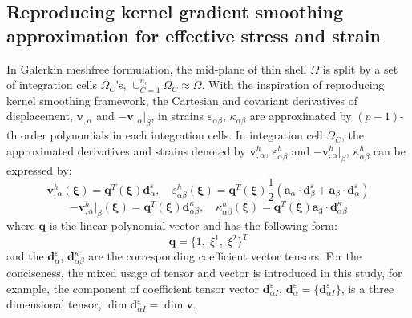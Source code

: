 \subsection{Reproducing kernel gradient smoothing approximation for effective stress and strain}
In Galerkin meshfree formulation, the mid-plane of thin shell $\Omega$ is split by a set of integration cells $\Omega_C$'s, $\cup_{C=1}^{n_e}\Omega_C\approx \Omega$. With the inspiration of reproducing kernel smoothing framework, the Cartesian and covariant derivatives of displacement, $\boldsymbol v_{,\alpha}$ and $-\boldsymbol v_{,\alpha}\vert_\beta$, in strains $\varepsilon_{\alpha\beta}$, $\kappa_{\alpha\beta}$ are approximated by $(p-1)$-th order polynomials in each integration cells. In integration cell $\Omega_C$, the approximated derivatives and strains denoted by $\boldsymbol v^h_{,\alpha}$, $\varepsilon^h_{\alpha\beta}$ and $-\boldsymbol v^h_{,\alpha}\vert_\beta$, $\kappa^h_{\alpha\beta}$ can be expressed by:
\begin{equation}\label{approxsn1}
    \boldsymbol v^h_{,\alpha}(\boldsymbol \xi) = \boldsymbol q^T(\boldsymbol \xi) \boldsymbol d_{\alpha}^\varepsilon, \quad
    \varepsilon^h_{\alpha\beta}(\boldsymbol \xi) = \boldsymbol q^T(\boldsymbol \xi) \frac{1}{2}(\boldsymbol a_\alpha \cdot \boldsymbol d_{\beta}^\varepsilon + \boldsymbol a_\beta \cdot \boldsymbol d_{\alpha}^\varepsilon)
\end{equation}
\begin{equation}\label{approxsn2}
    -\boldsymbol v^h_{,\alpha}\vert_\beta(\boldsymbol \xi) = \boldsymbol q^T(\boldsymbol \xi) \boldsymbol d_{\alpha\beta}^\kappa , \quad
    \kappa^h_{\alpha\beta}(\boldsymbol \xi) = \boldsymbol q^T(\boldsymbol \xi) \boldsymbol a_3 \cdot \boldsymbol d_{\alpha\beta}^\kappa
\end{equation}
where $\boldsymbol q$ is the linear polynomial vector and has the following form:
\begin{equation}
\boldsymbol q = \{ 1,\; \xi^1,\; \xi^2\}^T
\end{equation}
and the $\boldsymbol d^\varepsilon_{\alpha}$, $\boldsymbol d^\kappa_{\alpha\beta}$ are the corresponding coefficient vector tensors. For the conciseness, the mixed usage of tensor and vector is introduced in this study, for example, the component of coefficient tensor vector $\boldsymbol d^\varepsilon_{\alpha I}$, $\boldsymbol d^\varepsilon_\alpha = \{\boldsymbol d^\varepsilon_{\alpha I}\}$, is a three dimensional tensor, $\dim \boldsymbol d^\varepsilon_{\alpha I} = \dim \boldsymbol v$.

